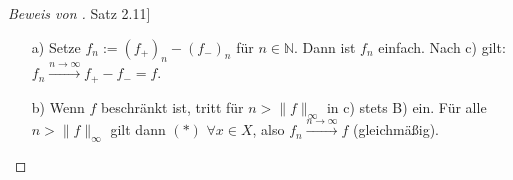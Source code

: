 \documentclass[a4paper]{report}
\newcommand{\N}{\mathbb{N}}
\newcommand{\jhyperref}[2]{\hyperref[j_#1]{#2}}
\newcommand{\jlink}[1]{\jhyperref{#1}{#1}}
\theoremstyle{plain}
\theoremstyle{definition}
\begin{document}
{{{\begin{proof}[Beweis von \jlink{Satz 2.11}]
\begin{itemize}
        \vspace{12pt}
        TODO: BILD
        \vspace{12pt}
        
        Ferner gilt
        \begin{displaymath}
            A_{jn} =
                \begin{cases}
                    A_{2j,n+1} \dot{\cup} A_{2j+1,n+1}, &j=0,\dots,n\cdot 2^n-1\\
                    \bigcup_{k=n\cdot 2^{n+1}}^{(n+1)\cdot 2^{n+1}} A_{k,n+1}, & j=n\cdot 2^n
                \end{cases}.
        \end{displaymath}
        Für $x \in A_{jn}$ gilt
        \begin{displaymath}
            f_n(x) = j\cdot 2^{-n}
            \begin{cases}
                = 2\cdot j \cdot 2^{-(n+1)} = f_{n+1}(x), & x\in A_{2j,n+1} \\
                \le (2\cdot j +1)\cdot 2^{-(n+1)} = f_{n+1}(x), & x\in A_{2j+1, n+1}
            \end{cases}
        \end{displaymath}
        Also gilt $f_n(x) \le f_{n+1}(x) \ \forall x\in A_{jn}$, falls $j < n\cdot 2^n$.\\
        Sei $x\in A_{n\cdot 2^n}$. Dann gilt $f_n(x) = n = n\cdot 2^{n+1}\cdot 2^{-(n+1)} \le k\cdot 2^{-(n+1)} = f_{n+1}(x)$ für alle $k\in\{n\cdot 2^{n+1}, \dots, (n+1)\cdot 2^{n+1}\}$.\\
        \uline{Also}: $f_n \le f_{n+1} \ (\forall n\in\N)$.
        \begin{itemize}
            \item[A)]
                Wenn $f(x) = \infty$, dann $x\in A_{n\cdot 2^n,n}$ für alle $n\in\N \Rightarrow f_n(x) = n \xrightarrow{n\rightarrow \infty} \infty = f(x)$.
            \item[B)]
                Wenn $f(x) < \infty$, dann liegt $x$ für alle $n\in\N$ mit $n>f(x)$ in einem $A_{j(n),n}$ mit $j(n) < n\cdot 2^{-n}$. Dann folgt
                \begin{displaymath}
                    f_n(x) = j(n)\cdot 2^{-n} \le f(x) \le f_n(x) + 2^{-n} \ \ \ (*).
                \end{displaymath}
                Und somit $|f(x)-f_n(x)| \le 2^{-n} \xrightarrow{n\rightarrow \infty} 0$, woraus Behauptung c) folgt.
        \end{itemize}
        \item[a)]
            Setze $f_n := (f_+)_n - (f_-)_n$ für $n\in\N$. Dann ist $f_n$ einfach. Nach c) gilt: $f_n\xrightarrow{n\rightarrow\infty} f_+ - f_- = f$.
        \item[b)]
            Wenn $f$ beschränkt ist, tritt für $n>\lVert f\rVert_\infty$ in c) stets B) ein. Für alle $n>\lVert f\rVert_\infty$ gilt dann $(*)$ $\forall x\in X$, also $f_n \xrightarrow{n\rightarrow \infty} f$ (gleichmäßig).
    \end{itemize}
\end{proof}
        	
}}}
\end{document}
